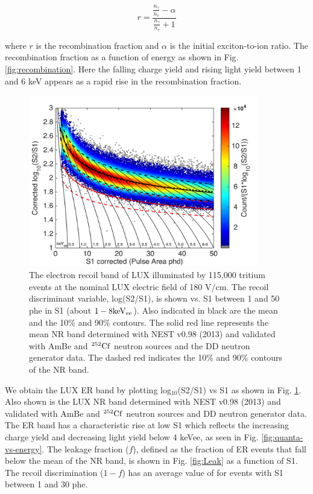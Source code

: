\begin{displaymath}
r = \frac{\frac{n_{\gamma}}{n_e} - \alpha}{\frac{n_{\gamma}}{n_e} + 1}
\end{displaymath}

\noindent
where $r$ is the recombination fraction and $\alpha$ is the initial exciton-to-ion ratio. The recombination fraction as a function of energy as shown in Fig. \ref{fig:recombination}. Here the falling charge yield and rising light yield between 1 and 6 keV appears as a rapid rise in the recombination fraction. 

\begin{figure}[h!]\centering
\includegraphics[width=100mm]{fig/CH3T_ER_Band.png}
\caption{The electron recoil band of LUX illuminated by 115,000 tritium events at the nominal LUX electric field of 180 V/cm.  The recoil discriminant variable, log(S2/S1), is shown vs. S1 between 1 and 50 phe in S1 (about $\rm1-8 keV_{ee}$). Also indicated in black are the mean and the 10\% and 90\% contours. The solid red line represents the mean NR band determined with NEST v0.98 (2013) \cite{nest} and validated with AmBe and $\rm^{252}Cf$ neutron sources and the DD neutron generator data. The dashed red indicates the 10\% and 90\% contours of the NR band.}
\label{fig:ER_band}
\end{figure}

We obtain the LUX ER band by plotting log$_{10}$(S2/S1) vs S1 as shown in Fig. \ref{fig:ER_band}. Also shown is the LUX NR band determined with NEST v0.98 (2013) \cite{nest} and validated with AmBe and $\rm^{252}Cf$ neutron sources and DD neutron generator data. The ER band has a characteristic rise at low S1 which reflects the increasing charge yield and decreasing light yield below 4 keVee, as seen in Fig. \ref{fig:quanta-vs-energy}. The leakage fraction ($f$), defined as the fraction of ER events that fall below the mean of the NR band, is shown in Fig. \ref{fig:Leak} as a function of S1. The recoil discrimination ($1-f$) has an average value of  for events with S1 between 1 and 30 phe.


